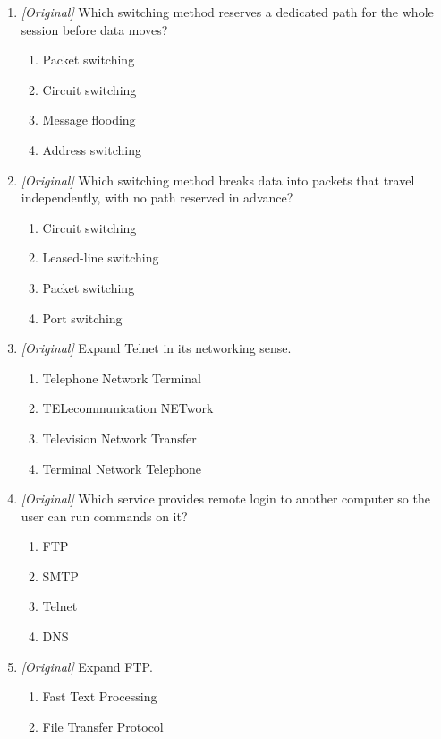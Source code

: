 \begin{enumerate}[label=\textbf{Q\arabic*.}, leftmargin=*]
\item \textit{[Original]} Which switching method reserves a dedicated path
  for the whole session before data moves?
  \begin{enumerate}[label=\Alph*.]
    \item Packet switching
    \item Circuit switching
    \item Message flooding
    \item Address switching
  \end{enumerate}
\item \textit{[Original]} Which switching method breaks data into packets
  that travel independently, with no path reserved in advance?
  \begin{enumerate}[label=\Alph*.]
    \item Circuit switching
    \item Leased-line switching
    \item Packet switching
    \item Port switching
  \end{enumerate}
\item \textit{[Original]} Expand Telnet in its networking sense.
  \begin{enumerate}[label=\Alph*.]
    \item Telephone Network Terminal
    \item TELecommunication NETwork
    \item Television Network Transfer
    \item Terminal Network Telephone
  \end{enumerate}
\item \textit{[Original]} Which service provides remote login to another
  computer so the user can run commands on it?
  \begin{enumerate}[label=\Alph*.]
    \item FTP
    \item SMTP
    \item Telnet
    \item DNS
  \end{enumerate}
\item \textit{[Original]} Expand FTP.
  \begin{enumerate}[label=\Alph*.]
    \item Fast Text Processing
    \item File Transfer Protocol

\end{enumerate}
\end{enumerate}
